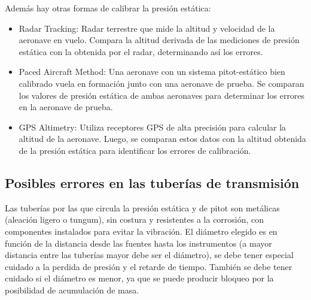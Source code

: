 Además hay otras formas de calibrar la presión estática:
\begin{itemize}
\item Radar Tracking: Radar terrestre que mide la altitud y velocidad de la aeronave en vuelo. Compara la altitud derivada de las mediciones de presión estática con la obtenida por el radar, determinando así los errores.
\item Paced Aircraft Method: Una aeronave con un sistema pitot-estático bien calibrado vuela en formación junto con una aeronave de prueba. Se comparan los valores de presión estática de ambas aeronaves para determinar los errores en la aeronave de prueba.
\item GPS Altimetry: Utiliza receptores GPS de alta precisión para calcular la altitud de la aeronave. Luego, se comparan estos datos con la altitud obtenida de la presión estática para identificar los errores de calibración.
\end{itemize}

\subsection{Posibles errores en las tuberías de transmisión}

Las tuberías por las que circula la presión estática y de pitot son metálicas (aleación ligero o tungum), sin costura y resistentes a la corrosión, con componentes instalados para evitar la vibración. El diámetro elegido es en función de la distancia desde las fuentes hasta los instrumentos (a mayor distancia entre las tuberías mayor debe ser el diámetro), se debe tener especial cuidado a la perdida de presión y el retarde de tiempo. También se debe tener cuidado si el diámetro es menor, ya que se puede producir bloqueo por la posibilidad de acumulación de masa.


